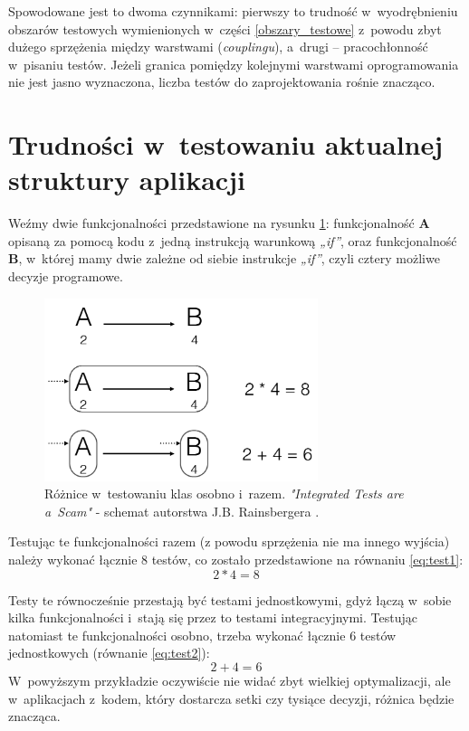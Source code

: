 Spowodowane jest to dwoma czynnikami: pierwszy to trudność w~wyodrębnieniu obszarów testowych wymienionych w~części \ref{obszary_testowe} z~powodu zbyt dużego sprzężenia między warstwami (\textit{couplingu}), a~drugi – pracochłonność w~pisaniu testów. Jeżeli granica pomiędzy kolejnymi warstwami oprogramowania nie jest jasno wyznaczona, liczba testów do zaprojektowania rośnie znacząco.


\section{Trudności w~testowaniu aktualnej struktury \newline aplikacji}
\label{testowanie_starej_struktury}

Weźmy dwie funkcjonalności przedstawione na rysunku \ref{fig:testowanie_klas}: funkcjonalność \textbf{A} opisaną za pomocą kodu z~jedną instrukcją warunkową \textit{„if”}, oraz funkcjonalność \textbf{B}, w~której mamy dwie zależne od siebie instrukcje \textit{„if”}, czyli cztery możliwe decyzje programowe. 

\begin{figure}[!htb]
    \centering
    \includegraphics[width=8cm]{imgs/ch3_przyklad_testowania_klas_pl.png}
    \caption
{Różnice w~testowaniu klas osobno i~razem. \textit{"Integrated Tests are a~Scam"} - schemat autorstwa J.B. Rainsbergera  \cite{website:android:testowanieklas}.}
    \label{fig:testowanie_klas}
\end{figure} 
\newpage
Testując te funkcjonalności razem (z powodu sprzężenia nie ma innego wyjścia) należy wykonać łącznie 8 testów, co zostało przedstawione na równaniu \ref{eq:test1}:
\begin{equation}
2*4=8 \label{eq:test1}
\end{equation}

Testy te równocześnie przestają być testami jednostkowymi, gdyż łączą w~sobie kilka funkcjonalności i~stają się przez to testami integracyjnymi. Testując natomiast te funkcjonalności osobno, trzeba wykonać łącznie 6 testów jednostkowych (równanie \ref{eq:test2}):
\begin{equation}
2+4=6 \label{eq:test2}
\end{equation}
W~powyższym przykładzie oczywiście nie widać zbyt wielkiej optymalizacji, ale w~aplikacjach z~kodem, który dostarcza setki czy tysiące decyzji, różnica będzie znacząca.

